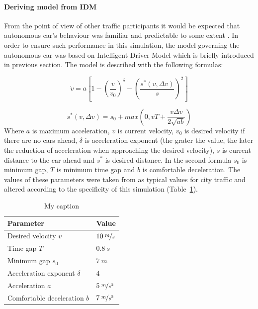 \documentclass[11pt,english]{article}
\begin{document}
\paragraph{Deriving model from IDM}%
From the point of view of other traffic participants it would be expected that autonomous car's behaviour was familiar and predictable to some extent \citep{sivak2015road}. In order to ensure such performance in this simulation, the model governing the autonomous car was based on Intelligent Driver Model which is briefly introduced in previous section. The model is described with the following formulas:



\begin{equation}
\dot{v}=a\left[1-\left(\frac{v}{v_0}\right)^{\delta}-\left(\frac{s^{*}\left ( v,\Delta v \right )}{s}\right)^{2}\right]
\end{equation}

\begin{equation}
s^{*}\left ( v,\Delta v \right )=s_0+max\left ( 0,vT+\frac{v\Delta v}{2 \sqrt{ab}} \right )
\end{equation}
Where $a$ is maximum acceleration, $v$ is current velocity, $v_0$ is desired velocity if there are no cars ahead, $\delta$ is acceleration exponent (the grater the value, the later the reduction of acceleration when approaching  the desired velocity), $s$ is current distance to the car ahead and  $s^{*}$ is desired distance.
In the second formula $s_0$ is minimum gap, $T$ is minimum time gap and $b$ is comfortable deceleration. The values of these parameters were taken from \citet{sivak2015road} as typical values for city traffic and altered according to the specificity of this simulation (Table~\ref{table:idm}).


\begin{table}[!]
\centering
\begin{tabular}{|p{7cm}|p{3cm}|}
\hline
\textbf{Parameter}          & \textbf{Value} \\ \hline
Desired velocity $v$          & $10\:\nicefrac{m}{s}$         \\ \hline
Time gap $T$                  & $0.8\:s$          \\ \hline
Minimum gap $s_0$            & $7\:m$            \\ \hline
Acceleration exponent $\delta$ & $4$              \\ \hline
Acceleration $a$              & $5\:\nicefrac{m}{s^2}$         \\ \hline
Comfortable deceleration $b$  & $7\:\nicefrac{m}{s^2}$         \\ \hline
\end{tabular}
\caption{My caption}
\label{table:idm}
\end{table}
\end{document}
